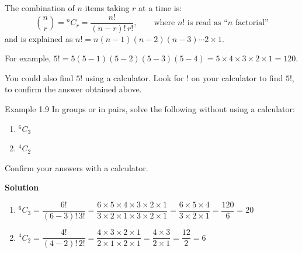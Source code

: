 The combination of $n$ items taking $r$ at a time is:
\[
  \binom{n}{r} = {}^{n}C_{r} = \frac{n!}{(n-r)!\,r!}, \qquad \text{where } n! \text{ is read as ``}n\text{ factorial''}
\]
and is explained as $n! = n(n-1)(n-2)(n-3)\cdots 2 \times 1$.

For example, $5! = 5(5-1)(5-2)(5-3)(5-4) = 5 \times 4 \times 3 \times 2 \times 1 = 120$.

You could also find $5!$ using a calculator. Look for $!$ on your calculator to
find $5!$, to confirm the answer obtained above.

\begin{example}{Example 1.9}
In groups or in pairs, solve the following without using a calculator:
\begin{enumerate}
  \item[a.] $^{6}C_{3}$
  \item[b.] $^{4}C_{2}$
\end{enumerate}
Confirm your answers with a calculator.

\medskip\noindent\textbf{Solution}
\begin{enumerate}
  \item[a.] $^{6}C_{3} = \dfrac{6!}{(6-3)!\,3!} = \dfrac{6\times5\times4\times3\times2\times1}{3\times2\times1\times3\times2\times1} = \dfrac{6\times5\times4}{3\times2\times1} = \dfrac{120}{6} = 20$
  \item[b.] $^{4}C_{2} = \dfrac{4!}{(4-2)!\,2!} = \dfrac{4\times3\times2\times1}{2\times1\times2\times1} = \dfrac{4\times3}{2\times1} = \dfrac{12}{2} = 6$
\end{enumerate}
\end{example}
